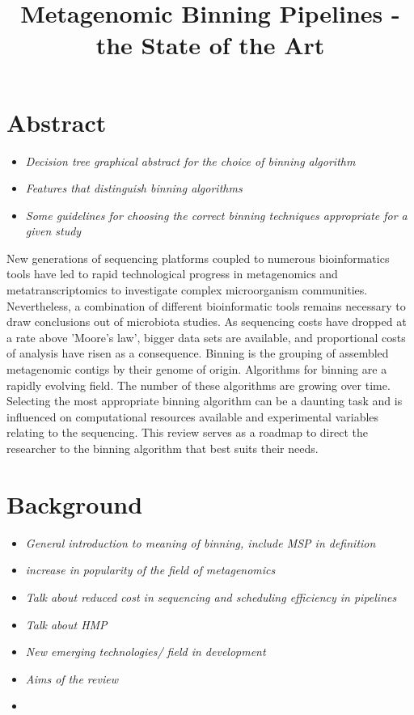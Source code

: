 \documentclass{article}
\title{Metagenomic Binning Pipelines - the State of the Art}
\date{}
\begin{document}
\maketitle

\section{Abstract}
\begin{itemize}
	\item \emph{Decision tree graphical abstract for the choice of binning algorithm}
	\item \emph{Features that distinguish binning algorithms}
	\item \emph{Some guidelines for choosing the correct binning techniques appropriate for a given study}
\end{itemize}
New generations of sequencing platforms coupled to numerous bioinformatics tools have led to rapid technological progress in metagenomics and metatranscriptomics to investigate complex microorganism communities.
Nevertheless, a combination of different bioinformatic tools remains necessary to draw conclusions out of microbiota studies.
As sequencing costs have dropped at a rate above 'Moore's law', bigger data sets are available, and proportional costs of analysis have risen as a consequence.
Binning is the grouping of assembled metagenomic contigs by their genome of origin.
Algorithms for binning are a rapidly evolving field.
The number of these algorithms are growing over time.
Selecting the most appropriate binning algorithm can be a daunting task and is influenced on computational resources available and experimental variables relating to the sequencing.
This review serves as a roadmap to direct the researcher to the binning algorithm that best suits their needs.


\section{Background}
\begin{itemize}
	\item \emph{General introduction to meaning of binning, include MSP in definition}
	\item \emph{increase in popularity of the field of metagenomics}
	\item \emph{Talk about reduced cost in sequencing and scheduling efficiency in pipelines}
	\item \emph{Talk about HMP}
	\item \emph{New emerging technologies/ field in development}
	\item \emph{Aims of the review}
	\item \emph{}
\end{itemize}
\end{document}
